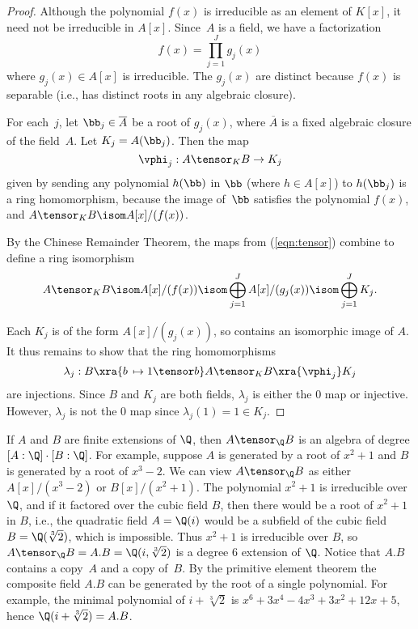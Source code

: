 \documentclass[11pt]{book}
\begin{document}
\begin{ch}
\begin{proof}
Although the polynomial $f(x)$ is irreducible as an element
of $K[x]$, it need not be irreducible in $A[x]$.  Since~$A$
is a field,  we have a factorization
$$
   f(x) = \prod_{j=1}^J g_j(x)
$$
where $g_j(x)\in A[x]$ is irreducible.  The $g_j(x)$ are
distinct because $f(x)$ is separable (i.e., has distinct
roots in any algebraic closure).

For each~$j$, let $\bb_j\in \overline{A}$ be a root of $g_j(x)$, where
$\overline{A}$ is a fixed
algebraic closure of the field~$A$.  Let $K_j = A(\bb_j)$.
Then the map
\begin{equation}\label{eqn:tensor}
  \vphi_j : A\tensor_K B \to K_j
\end{equation}
given by sending any polynomial $h(\bb)$ in $\bb$ (where $h\in A[x]$)
to $h(\bb_j)$ is a ring homomorphism, because the image
of~$\bb$ satisfies the polynomial $f(x)$, and $A\tensor_K B\isom A[x]/(f(x))$.

By the Chinese Remainder Theorem, the maps from (\ref{eqn:tensor})
combine to define a ring isomorphism
$$
 A\tensor_K B \isom A[x]/(f(x)) \isom \bigoplus_{j=1}^J A[x]/(g_j(x))
   \isom \bigoplus_{j=1}^J K_j.
$$

Each $K_j$ is of the form $A[x]/(g_j(x))$, so contains an isomorphic
image of $A$.  It thus remains to show that the ring
homomorphisms
$$
  \lambda_j : B \xra{b\,\mapsto 1\tensor b} A\tensor_K B \xra{\vphi_j} K_j
$$
are injections.  Since $B$ and $K_j$ are both fields, $\lambda_j$
is either the $0$ map or injective.  However, $\lambda_j$ is
not the $0$ map since $\lambda_j(1)=1\in K_j$.
\end{proof}
\begin{example}
  If $A$ and $B$ are finite extensions of $\Q$, then $A\tensor_\Q B$
  is an algebra of degree $[A:\Q]\cdot [B:\Q]$. For example, suppose
  $A$ is generated by a root of $x^2+1$ and $B$ is generated by a root
  of $x^3-2$.  We can view $A\tensor_\Q B$ as either $A[x]/(x^3-2)$ or
  $B[x]/(x^2+1)$.  The polynomial $x^2+1$ is irreducible over $\Q$,
  and if it factored over the cubic field $B$, then there would be a
  root of $x^2+1$ in $B$, i.e., the quadratic field $A=\Q(i)$ would be
  a subfield of the cubic field $B=\Q(\sqrt[3]{2})$, which is
  impossible.  Thus $x^2+1$ is irreducible over $B$, so $A\tensor_\Q B
  = A.B = \Q(i,\sqrt[3]{2})$ is a degree $6$ extension of $\Q$.
  Notice that $A.B$ contains a copy~$A$ and a copy of~$B$. By the
  primitive element theorem the composite field $A.B$ can be generated
  by the root of a single polynomial. For example, the minimal
  polynomial of $i+\sqrt[3]{2}$ is $x^6 + 3x^4 - 4x^3 + 3x^2 + 12x +
  5$, hence $\Q(i+\sqrt[3]{2})=A.B$.
\end{example}


\end{ch}
\end{document}
